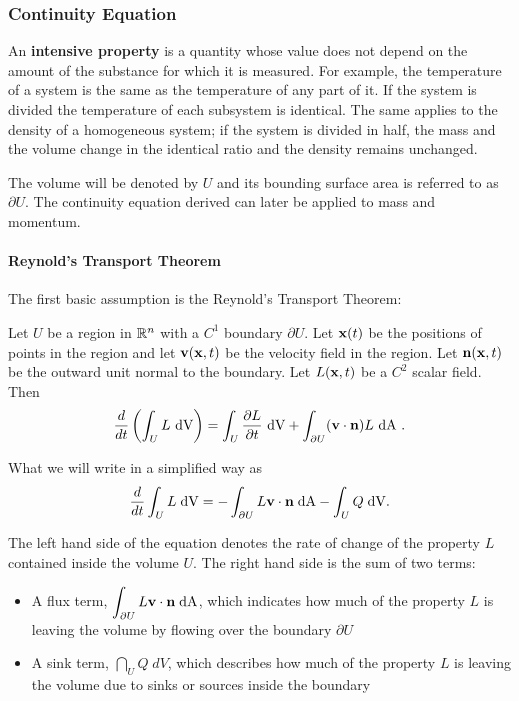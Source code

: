 \subsubsection*{Continuity Equation}

An \textbf{intensive property} is a  quantity whose value does not depend on the amount of the substance for which it is measured. For example, the temperature of a system  is the same as the temperature of any part of it. If the system is divided the temperature of each subsystem is identical. The same applies to the density of a homogeneous system; if the system is divided in half, the mass and the volume change in the identical ratio and the density remains unchanged.

The volume will be denoted by  $U$ and its bounding surface area is referred to as $\partial U$. The continuity equation derived can later be applied to mass and momentum.

\paragraph{Reynold's Transport Theorem}

The first basic assumption is the  Reynold's Transport Theorem:


\begin{theorem}
 Let \( U\) be a region in $\mathbb{R}^n$ with a $C^1$ boundary
\(\partial  U\). Let \(\mathbf{ x}(t)\) be the  positions of
points in the region and let \(\mathbf{ v}(\mathbf{ x},t)\) be the
velocity field in the region. Let \(\mathbf{ n}(\mathbf{ x},t)\) be the
outward unit normal to
the boundary. Let \(L(\mathbf{ x},t)\) be a $C^2$ scalar field. Then
\[\dfrac{d}{dt}\left(\int_{ U} L~\mathrm{dV}\right) = 
     \int_{ U} \frac{\partial L}{\partial t}~\mathrm{dV} + \int_{\partial  U} (\mathbf{ v}\cdot\mathbf{ n})L~\mathrm{dA} ~.\]
\end{theorem}


What we will write in a simplified way as
\begin{equation}
\dfrac{d}{dt}\displaystyle\int_U L \;\mathrm{dV} = - \displaystyle\int_{\partial U} L\mathbf{ v} \cdot \mathbf{ n}\;\mathrm{dA} - \displaystyle\int_U Q\; \mathrm{dV}.
\end{equation}

The left hand side of the equation denotes the rate of change of the property $L$ contained inside the volume $ U$. The right hand side is the sum of two terms:
\begin{itemize}
    \item A flux term, $\displaystyle\int_{\partial U} L\mathbf{ v} \cdot \mathbf{ n}\;\mathrm{dA}$, which indicates how much of the property $L$ is leaving the volume by flowing over the boundary $\partial U$
    \item A sink term, $\dint_ U Q\; dV$, which describes how much of the property $L$ is leaving the volume due to sinks or sources inside the boundary
\end{itemize}

